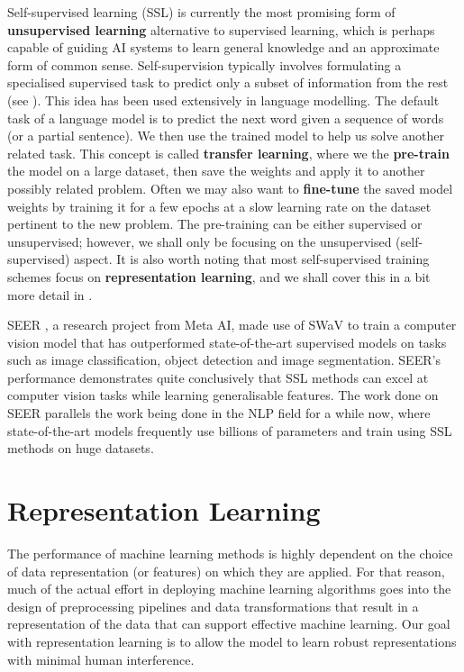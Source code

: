 Self-supervised learning (SSL) is currently the most promising form of \textbf{unsupervised learning} alternative to supervised learning, which is perhaps capable of guiding AI systems to learn general knowledge and an approximate form of common sense. Self-supervision typically involves formulating a specialised supervised task to predict only a subset of information from the rest (see ). This idea has been used extensively in language modelling. The default task of a language model is to predict the next word given a sequence of words (or a partial sentence). We then use the trained model to help us solve another related task. This concept is called \textbf{transfer learning}, where we the \textbf{pre-train} the model on a large dataset, then save the weights and apply it to another possibly related problem. Often we may also want to \textbf{fine-tune} the saved model weights by training it for a few epochs at a slow learning rate on the dataset pertinent to the new problem.
The pre-training can be either supervised or unsupervised; however, we shall only be focusing on the unsupervised (self-supervised) aspect. It is also worth noting that most self-supervised training schemes focus on \textbf{representation learning}, and we shall cover this in a bit more detail in .

SEER \parencite{Goyal2021}, a research project from Meta AI, made use of SWaV \parencite{caron2020unsupervised} to train a computer vision model that has outperformed state-of-the-art supervised models on tasks such as image classification, object detection and image segmentation. SEER's performance demonstrates quite conclusively that SSL methods can excel at computer vision tasks while learning generalisable features. The work done on SEER parallels the work being done in the NLP field for a while now, where state-of-the-art models frequently use billions of parameters and train using SSL methods on huge datasets.


\section{Representation Learning} \label{sec:repr-learning}
The performance of machine learning methods is highly dependent on the choice of data representation (or features) on which they are applied. For that reason, much of the actual effort in deploying machine learning algorithms goes into the design of preprocessing pipelines and data transformations that result in a representation of the data that can support effective machine learning. Our goal with representation learning is to allow the model to learn robust representations with minimal human interference.

